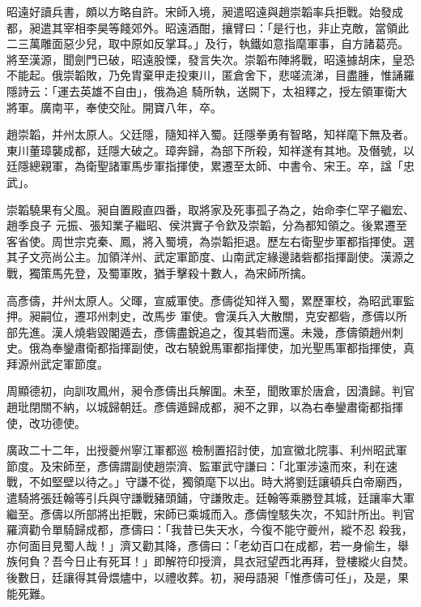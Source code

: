 \begin{pinyinscope}
 昭遠好讀兵書，頗以方略自許。宋師入境，昶遣昭遠與趙崇韜率兵拒戰。始發成都，昶遣其宰相李昊等餞郊外。昭遠酒酣，攘臂曰：「是行也，非止克敵，當領此二三萬雕面惡少兒，取中原如反掌耳。」及行，執鐵如意指麾軍事，自方諸葛亮。將至漢源，聞劍門已破，昭遠股慄，發言失次。崇韜布陣將戰，昭遠據胡床，皇恐不能起。俄崇韜敗，乃免胄棄甲走投東川，匿倉舍下，悲嗟流涕，目盡腫，惟誦羅隱詩云：「運去英雄不自由」，俄為追
 騎所執，送闕下，太祖釋之，授左領軍衛大將軍。廣南平，奉使交阯。開寶八年，卒。



 趙崇韜，并州太原人。父廷隱，隨知祥入蜀。廷隱拳勇有智略，知祥麾下無及者。東川董璋襲成都，廷隱大破之。璋奔歸，為部下所殺，知祥遂有其地。及僭號，以廷隱總親軍，為衛聖諸軍馬步軍指揮使，累遷至太師、中書令、宋王。卒，諡「忠武」。



 崇韜驍果有父風。昶自置殿直四番，取將家及死事孤子為之，始命李仁罕子繼宏、趙季良子
 元振、張知業子繼昭、侯洪實子令欽及崇韜，分為都知領之。後累遷至客省使。周世宗克秦、鳳，將入蜀境，為崇韜拒退。歷左右衛聖步軍都指揮使。選其子文亮尚公主。加領洋州、武定軍節度、山南武定緣邊諸砦都指揮副使。漢源之戰，獨策馬先登，及蜀軍敗，猶手擊殺十數人，為宋師所擒。



 高彥儔，并州太原人。父暉，宣威軍使。彥儔從知祥入蜀，累歷軍校，為昭武軍監押。昶嗣位，遷邛州刺史，改馬步
 軍使。會漢兵入大散關，克安都砦，彥儔以所部先進。漢人燒砦毀閣遁去，彥儔盡銳追之，復其砦而還。未幾，彥儔領趙州刺史。俄為奉鑾肅衛都指揮副使，改右驍銳馬軍都指揮使，加光聖馬軍都指揮使，真拜源州武定軍節度。



 周顯德初，向訓攻鳳州，昶令彥儔出兵解圍。未至，聞敗軍於唐倉，因潰歸。判官趙玭閉關不納，以城歸朝廷。彥儔遁歸成都，昶不之罪，以為右奉鑾肅衛都指揮使，改功德使。



 廣政二十二年，出授夔州寧江軍都巡
 檢制置招討使，加宣徽北院事、利州昭武軍節度。及宋師至，彥儔謂副使趙崇濟、監軍武守謙曰：「北軍涉遠而來，利在速戰，不如堅壁以待之。」守謙不從，獨領麾下以出。時大將劉廷讓頓兵白帝廟西，遣騎將張廷翰等引兵與守謙戰豬頭鋪，守謙敗走。廷翰等乘勝登其城，廷讓率大軍繼至。彥儔以所部將出拒戰，宋師已乘城而入。彥儔惶駭失次，不知計所出。判官羅濟勸令單騎歸成都，彥儔曰：「我昔已失天水，今復不能守夔州，縱不忍
 殺我，亦何面目見蜀人哉！」濟又勸其降，彥儔曰：「老幼百口在成都，若一身偷生，舉族何負？吾今日止有死耳！」即解符印授濟，具衣冠望西北再拜，登樓縱火自焚。後數日，廷讓得其骨煨燼中，以禮收葬。初，昶母語昶「惟彥儔可任」，及是，果能死難。




\end{pinyinscope}
